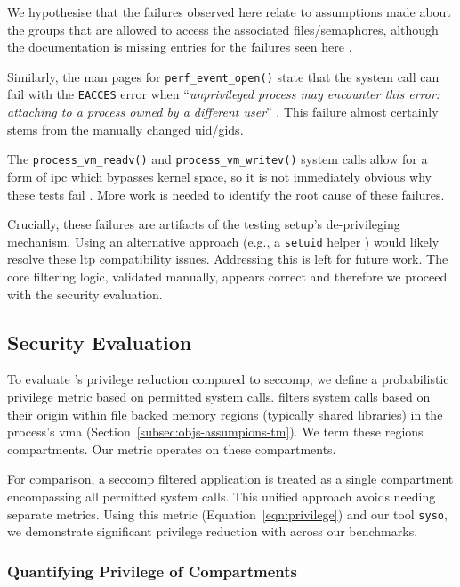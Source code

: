 We hypothesise that the failures observed here relate to 
assumptions made about the groups that are allowed to access the associated
files/semaphores, although the documentation is missing entries for the failures
seen here \cite{LTPFailDocs}. 

Similarly, the man pages for \texttt{perf\_event\_open()} state that the system 
call can fail with the \texttt{EACCES} error when 
``\textit{unprivileged process may encounter this error: attaching to a 
process owned by a different user}'' \cite{perfEventOpen2}. 
This failure almost certainly stems from the manually changed \ac{uid}/\acp{gid}.

The \texttt{process\_vm\_readv()} and \texttt{process\_vm\_writev()} system calls 
allow for a form of \ac{ipc} which bypasses kernel space, so it is not immediately 
obvious why these tests fail \cite{process_vm_readv}. More work is needed to
identify the root cause of these failures.

Crucially, these failures are artifacts of the testing setup's de-privileging
mechanism. Using an alternative approach (e.g., a \texttt{setuid} helper
\cite{von2010ubuntu}) would
likely resolve these \ac{ltp} compatibility issues. Addressing this is left
for future work. The core filtering logic, validated manually, appears
correct and therefore we proceed with the security evaluation.

\subsection{Security Evaluation}\label{subsec:security-eval}

To evaluate \af's privilege reduction compared to seccomp, we define a
probabilistic privilege metric based on permitted system calls. \af filters 
system calls based on their origin within file backed memory regions 
(typically shared libraries) in the process's \ac{vma} 
(Section~\ref{subsec:objs-assumpions-tm}). We term these regions compartments. 
Our metric operates on these compartments. 

For comparison, a seccomp filtered  application is treated as a single
compartment encompassing all permitted system  calls. This unified approach
avoids needing separate metrics. Using this metric 
(Equation~\ref{eqn:privilege}) and our tool \texttt{syso}, we demonstrate
significant privilege reduction with \af across our benchmarks.
 
\subsubsection{Quantifying Privilege of
Compartments}\label{subsubsec:eval-quant-privilege}

